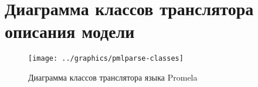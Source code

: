 \chapter{Диаграмма классов транслятора описания модели}
\label{cha:pmlparse-classes}

\begin{figure}[!tb]
  \centering
  \texttt{[image: ../graphics/pmlparse-classes]}
  \caption{Диаграмма классов транслятора языка Promela}
  \label{fig:pmlparse-classes}
\end{figure}

